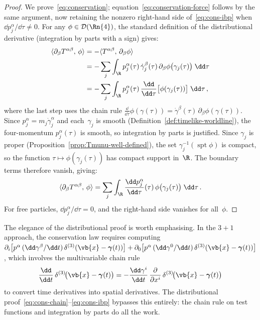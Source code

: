 \begin{proof}
  We prove~\eqref{eq:conservation};
  equation~\eqref{eq:conservation-force} follows by the same
  argument, now retaining the nonzero right-hand side
  of~\eqref{eq:cons-ibp} when $\dd p_j^\alpha/\dd\tau \neq 0$.
  For any $\phi \in \mathcal{D}(\Rn{4})$, the standard definition
  of the distributional derivative (integration by parts with a
  sign) gives:
  \begin{align}
    \langle \partial_\beta T^{\alpha\beta},\,\phi\rangle
      &= -\langle T^{\alpha\beta},\,\partial_\beta\phi\rangle
      \notag\\
      &= -\sum_j \int_{\R} p_j^\alpha(\tau)\,
        \dot\gamma_j^\beta(\tau)\,
        \partial_\beta\phi\bigl(\gamma_j(\tau)\bigr)\;\dd\tau
      \notag\\
      &= -\sum_j \int_{\R} p_j^\alpha(\tau)\,
        \frac{\dd}{\dd\tau}\bigl[\phi(\gamma_j(\tau))\bigr]
        \;\dd\tau\,,
        \label{eq:cons-chain}
  \end{align}
  where the last step uses the chain rule
  $\frac{\dd}{\dd\tau}\phi(\gamma(\tau))
  = \dot\gamma^\beta(\tau)\,\partial_\beta\phi(\gamma(\tau))$.
  Since $p_j^\alpha = m_j\dot\gamma_j^\alpha$ and each~$\gamma_j$
  is smooth (Definition~\ref{def:timelike-worldline}), the
  four-momentum $p_j^\alpha(\tau)$ is smooth, so integration by
  parts is justified.  Since $\gamma_j$ is proper
  (Proposition~\ref{prop:Tmunu-well-defined}), the set
  $\gamma_j^{-1}(\operatorname{spt}\phi)$ is compact, so the
  function $\tau \mapsto \phi(\gamma_j(\tau))$ has compact support
  in~$\R$.  The boundary terms therefore vanish, giving:
  \begin{equation}\label{eq:cons-ibp}
    \langle \partial_\beta T^{\alpha\beta},\,\phi\rangle
      = \sum_j \int_{\R}
        \frac{\dd p_j^\alpha}{\dd\tau}(\tau)\,
        \phi\bigl(\gamma_j(\tau)\bigr)\;\dd\tau\,.
  \end{equation}
  For free particles, $\dd p_j^\alpha/\dd\tau = 0$, and the
  right-hand side vanishes for all~$\phi$.
\end{proof}

\begin{remark}
  The elegance of the distributional proof is worth
  emphasising.  In the $3{+}1$ approach, the conservation law
  requires computing
  $\partial_i\bigl[p^\alpha\,(\dd\gamma^\beta/\dd t)\,
  \delta^{(3)}(\vb{x} - \boldsymbol{\gamma}(t))\bigr]
  + \partial_0\bigl[p^\alpha\,(\dd\gamma^0/\dd t)\,
  \delta^{(3)}(\vb{x} - \boldsymbol{\gamma}(t))\bigr]$,
  which involves the multivariable chain rule
  \[
    \frac{\dd}{\dd t}\,\delta^{(3)}\!\bigl(\vb{x}
    - \boldsymbol{\gamma}(t)\bigr)
    = -\frac{\dd\gamma^i}{\dd t}\,
      \frac{\partial}{\partial x^i}\,
      \delta^{(3)}\!\bigl(\vb{x}
      - \boldsymbol{\gamma}(t)\bigr)
  \]
  to convert time derivatives into spatial derivatives.  The
  distributional proof~\eqref{eq:cons-chain}--\eqref{eq:cons-ibp}
  bypasses this entirely: the chain rule on test functions and
  integration by parts do all the work.
\end{remark}

